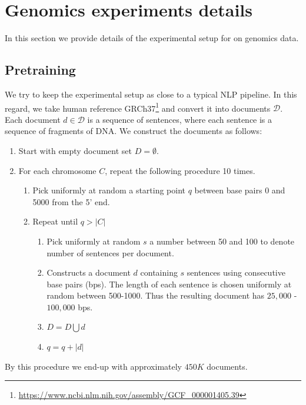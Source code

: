 \section{Genomics experiments details}
\label{sec:apndx-expt-bio}

In this section we provide details of the experimental setup for \bigb on genomics data.

\subsection{Pretraining}
\label{sec:apndx-expt-bio:mlm}
We try to keep the experimental setup as close to a typical NLP pipeline.
In this regard, we take human reference GRCh37\footnote{\url{https://www.ncbi.nlm.nih.gov/assembly/GCF_000001405.39}} and convert it into documents $\mathcal{D}$. Each document $d\in \mathcal{D}$ is a sequence of sentences, where each sentence is a sequence of fragments of DNA. We construct the documents as follows:
\begin{enumerate}[leftmargin=6mm, itemsep=2mm, partopsep=0pt,parsep=0pt]
    \item Start with empty document set $D = \emptyset$.
    \item For each chromosome $C$, repeat the following procedure 10 times.
    \begin{enumerate}[leftmargin=6mm, itemsep=2mm, partopsep=0pt,parsep=0pt]
         \item Pick uniformly at random a starting point $q$ between base pairs 0 and 5000 from the 5' end.
    \item Repeat until $q > |C|$
    \begin{enumerate}[leftmargin=6mm, itemsep=2mm, partopsep=0pt,parsep=0pt]
    \vspace{1mm}
        \item Pick uniformly at random $s$ a number between 50 and 100 to denote number of sentences per document.
         \item Constructs a document $d$ containing $s$ sentences using consecutive base pairs (bps). The length of each sentence is chosen uniformly at random between 500-1000. Thus the resulting document has $25,000$ - $100,000$ bps. 
        \item $D = D \bigcup d$
        \item $q = q + |d|$
    \end{enumerate}
\end{enumerate}
\end{enumerate}
By this procedure we end-up with approximately $450K$ documents.

